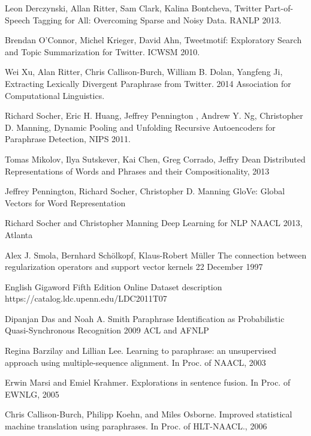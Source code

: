 \documentclass[conference]{IEEEtran}
\begin{document}
%
%
%
\begin{thebibliography}{1}

Leon Derczynski, Allan Ritter, Sam Clark, Kalina Bontcheva, 
Twitter Part-of-Speech Tagging for All: Overcoming Sparse and Noisy Data.
RANLP 2013.

Brendan O’Connor, Michel Krieger, David Ahn,
Tweetmotif: Exploratory Search and Topic Summarization for Twitter.
ICWSM 2010.

Wei Xu, Alan Ritter, Chris Callison-Burch, William B. Dolan, Yangfeng Ji, 
Extracting Lexically Divergent Paraphrase from Twitter. 
2014 Association for Computational Linguistics.

Richard Socher, Eric H. Huang, Jeffrey Pennington
, Andrew Y. Ng, Christopher D. Manning, Dynamic Pooling and Unfolding Recursive
Autoencoders for Paraphrase Detection, NIPS 2011.

Tomas Mikolov, Ilya Sutskever, Kai Chen,
Greg Corrado, Jeffry Dean
Distributed Representations of Words and Phrases
and their Compositionality, 2013

Jeffrey Pennington, Richard Socher, Christopher D. Manning
GloVe: Global Vectors for Word Representation

Richard Socher and Christopher Manning
Deep	 Learning for NLP
NAACL 2013, Atlanta

Alex J. Smola, Bernhard Sch{\"o}lkopf, Klaus-Robert M{\"u}ller
The connection between regularization operators and support vector kernels
 22 December 1997

English Gigaword Fifth Edition
Online Dataset description
https://catalog.ldc.upenn.edu/LDC2011T07

Dipanjan Das and Noah A. Smith
Paraphrase Identification as Probabilistic Quasi-Synchronous Recognition
2009 ACL and AFNLP

Regina Barzilay and Lillian Lee.
Learning to paraphrase: an unsupervised approach using multiple-sequence alignment. 
In Proc. of NAACL, 2003

Erwin Marsi and Emiel Krahmer.
Explorations in sentence fusion. 
In Proc. of EWNLG, 2005

Chris Callison-Burch, Philipp Koehn, and Miles Osborne.
Improved statistical machine translation using paraphrases. 
In Proc. of HLT-NAACL., 2006

\end{thebibliography}



\end{document}
